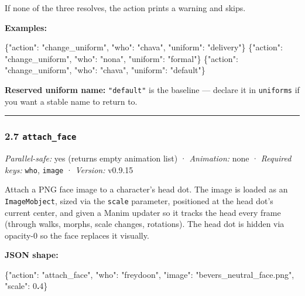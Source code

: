 \documentclass[
  12pt,
  letterpaper,
]{book}
\newenvironment{Shaded}{}{}
\newcommand{\DataTypeTok}[1]{\textcolor[rgb]{0.56,0.13,0.00}{#1}}
\newcommand{\DecValTok}[1]{\textcolor[rgb]{0.25,0.63,0.44}{#1}}
\newcommand{\ErrorTok}[1]{\textcolor[rgb]{1.00,0.00,0.00}{\textbf{#1}}}
\newcommand{\FunctionTok}[1]{\textcolor[rgb]{0.02,0.16,0.49}{#1}}
\newcommand{\StringTok}[1]{\textcolor[rgb]{0.25,0.44,0.63}{#1}}
\begin{document}
If none of the three resolves, the action prints a warning and skips.

\textbf{Examples:}

\begin{Shaded}
\begin{Highlighting}[]
\FunctionTok{\{}\DataTypeTok{"action"}\FunctionTok{:} \StringTok{"change\_uniform"}\FunctionTok{,} \DataTypeTok{"who"}\FunctionTok{:} \StringTok{"chava"}\FunctionTok{,} \DataTypeTok{"uniform"}\FunctionTok{:} \StringTok{"delivery"}\FunctionTok{\}}
\FunctionTok{\{}\DataTypeTok{"action"}\FunctionTok{:} \StringTok{"change\_uniform"}\FunctionTok{,} \DataTypeTok{"who"}\FunctionTok{:} \StringTok{"nona"}\FunctionTok{,}  \DataTypeTok{"uniform"}\FunctionTok{:} \StringTok{"formal"}\FunctionTok{\}}
\FunctionTok{\{}\DataTypeTok{"action"}\FunctionTok{:} \StringTok{"change\_uniform"}\FunctionTok{,} \DataTypeTok{"who"}\FunctionTok{:} \StringTok{"chava"}\FunctionTok{,} \DataTypeTok{"uniform"}\FunctionTok{:} \StringTok{"default"}\FunctionTok{\}}
\end{Highlighting}
\end{Shaded}

\textbf{Reserved uniform name:} \texttt{"default"} is the baseline ---
declare it in \texttt{uniforms} if you want a stable name to return to.

\begin{center}\rule{0.5\linewidth}{0.5pt}\end{center}

\subsubsection{\texorpdfstring{2.7
\texttt{attach\_face}}{2.7 attach\_face}}\label{attach_face}

\emph{Parallel-safe:} yes (returns empty animation list) ·
\emph{Animation:} none · \emph{Required keys:} \texttt{who},
\texttt{image} · \emph{Version:} v0.9.15

Attach a PNG face image to a character's head dot. The image is loaded
as an \texttt{ImageMobject}, sized via the \texttt{scale} parameter,
positioned at the head dot's current center, and given a Manim updater
so it tracks the head every frame (through walks, morphs, scale changes,
rotations). The head dot is hidden via opacity-0 so the face replaces it
visually.

\textbf{JSON shape:}

\begin{Shaded}
\begin{Highlighting}[]
\FunctionTok{\{}\DataTypeTok{"action"}\FunctionTok{:} \StringTok{"attach\_face"}\FunctionTok{,} \DataTypeTok{"who"}\FunctionTok{:} \StringTok{"freydoon"}\FunctionTok{,}
 \DataTypeTok{"image"}\FunctionTok{:} \StringTok{"bevers\_neutral\_face.png"}\FunctionTok{,} \DataTypeTok{"scale"}\FunctionTok{:} \DecValTok{0}\ErrorTok{.}\DecValTok{4}\FunctionTok{\}}
\end{Highlighting}
\end{Shaded}
\end{document}
